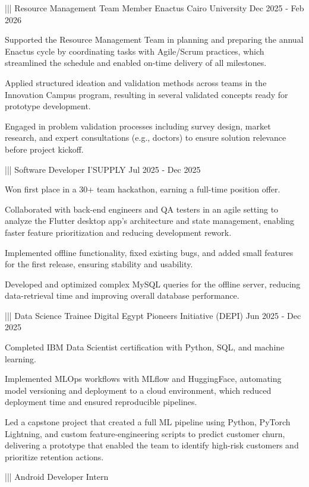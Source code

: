 {{    }%
    |||
    {Resource Management Team Member}%
    {Enactus Cairo University}%
    {Dec 2025 - Feb 2026}%
    {%
        \item Supported the Resource Management Team in planning and preparing the annual Enactus cycle by coordinating tasks with Agile/Scrum practices, which streamlined the schedule and enabled on-time delivery of all milestones.
        \item Applied structured ideation and validation methods across teams in the Innovation Campus program, resulting in several validated concepts ready for prototype development.
        \item Engaged in problem validation processes including survey design, market research, and expert consultations (e.g., doctors) to ensure solution relevance before project kickoff.
    }%
    |||
    {Software Developer}%
    {I'SUPPLY}%
    {Jul 2025 - Dec 2025}%
    {%
        \item Won first place in a 30+ team hackathon, earning a full-time position offer.
        \item Collaborated with back-end engineers and QA testers in an agile setting to analyze the Flutter desktop app's architecture and state management, enabling faster feature prioritization and reducing development rework.  
        \item Implemented offline functionality, fixed existing bugs, and added small features for the first release, ensuring stability and usability.
        \item Developed and optimized complex MySQL queries for the offline server, reducing data-retrieval time and improving overall database performance.
    }%
    |||
    {Data Science Trainee}%
    {Digital Egypt Pioneers Initiative (DEPI)}%
    {Jun 2025 - Dec 2025}%
    {%
        \item Completed IBM Data Scientist certification with Python, SQL, and machine learning.
        \item Implemented MLOps workflows with MLflow and HuggingFace, automating model versioning and deployment to a cloud environment, which reduced deployment time and ensured reproducible pipelines.
        \item Led a capstone project that created a full ML pipeline using Python, PyTorch Lightning, and custom feature-engineering scripts to predict customer churn, delivering a prototype that enabled the team to identify high-risk customers and prioritize retention actions.
    }%
    |||
    {Android Developer Intern}%
}
